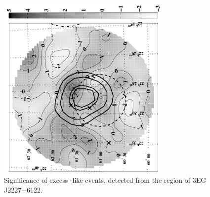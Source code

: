 \begin{figure}[p]
\centerline{\includegraphics[draft=false,angle=270,width=0.75\textwidth]{plots/chap-observations/loenergy/J2227+6122_sigma_conv_bw.pdf}}
\caption{\label{FIG::OBSERVATIONS::J2227SIGMA} Significance of excess
{\Grayc}-like events, detected from the region of 3EG J2227$+$6122.}
\end{figure}


